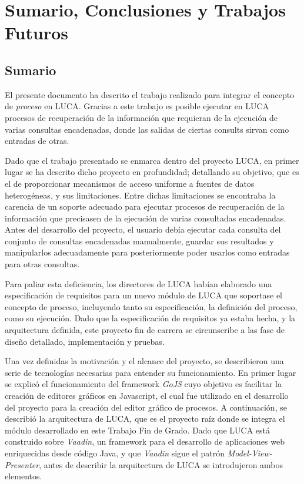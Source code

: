 \chapter{Sumario, Conclusiones y Trabajos Futuros}

\section{Sumario}

El presente documento ha descrito el trabajo realizado para integrar el concepto de \emph{proceso} en LUCA. Gracias a este trabajo es posible ejecutar en LUCA procesos de recuperación de la información que requieran de la ejecución de varias consultas encadenadas, donde las salidas de ciertas consults sirvan como entradas de otras. 

Dado que el trabajo presentado se enmarca dentro del proyecto LUCA, en primer lugar se ha descrito dicho proyecto en profundidad; detallando su objetivo, que es el de proporcionar mecanismos de acceso uniforme a fuentes de datos heterogéneas, y sus limitaciones. Entre dichas limitaciones se encontraba la carencia de un soporte adecuado para ejecutar procesos de recuperación de la información que precisasen de la ejecución de varias consultadas encadenadas. Antes del desarrollo del proyecto, el usuario debía ejecutar cada consulta del conjunto de consultas encadenadas manualmente, guardar sus resultados y manipularlos adecuadamente para posteriormente poder usarlos como entradas para otras consultas. 

Para paliar esta deficiencia, los directores de LUCA habían elaborado una especificación de requisitos para un nuevo módulo de LUCA que soportase el concepto de proceso, incluyendo tanto su especificación, la definición del proceso, como su ejecución. Dado que la especificación de requisitos ya estaba hecha, y la arquitectura definida, este proyecto fin de carrera se circunscribe a las fase de diseño detallado, implementación y pruebas. 

Una vez definidas la motivación y el alcance del proyecto, se describieron una serie de tecnologías necesarias para entender su funcionamiento. En primer lugar se explicó el funcionamiento del framework \emph{GoJS} cuyo objetivo es facilitar la creación de editores gráficos en Javascript, el cual fue utilizado en el desarrollo del proyecto para la creación del editor gráfico de procesos. A continuación, se describió la arquitectura de LUCA, que es el proyecto raíz donde se integra el módulo desarrollado en este Trabajo Fin de Grado. Dado que LUCA está construido sobre \emph{Vaadin}, un framework para el desarrollo de aplicaciones web enriquecidas desde código Java, y que \emph{Vaadin} sigue el patrón \emph{Model-View-Presenter}, antes de describir la arquitectura de LUCA se introdujeron ambos elementos. 

